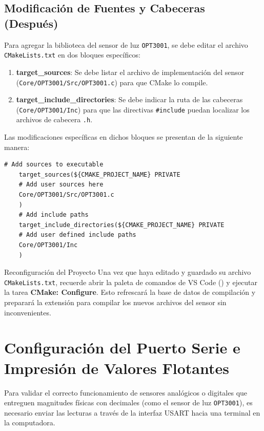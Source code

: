 \documentclass[
10pt, %
a4paper, %
oneside, %
headinclude,footinclude, %
BCOR5mm, %
]{scrartcl}
\begin{document}
\subsection{Modificación de Fuentes y Cabeceras (Después)}
Para agregar la biblioteca del sensor de luz \texttt{OPT3001}, se debe editar el archivo \texttt{CMakeLists.txt} en dos bloques específicos:
\begin{enumerate}
	\item \textbf{target\_sources}: Se debe listar el archivo de implementación del sensor (\texttt{Core/OPT3001/Src/OPT3001.c}) para que CMake lo compile.
	\item \textbf{target\_include\_directories}: Se debe indicar la ruta de las cabeceras (\texttt{Core/OPT3001/Inc}) para que las directivas \texttt{\#include} puedan localizar los archivos de cabecera \texttt{.h}.
\end{enumerate}
Las modificaciones específicas en dichos bloques se presentan de la siguiente manera:
\begin{lstlisting}[style=CMakeStyle]
	# Add sources to executable
	target_sources(${CMAKE_PROJECT_NAME} PRIVATE
	# Add user sources here
	Core/OPT3001/Src/OPT3001.c
	)
	# Add include paths
	target_include_directories(${CMAKE_PROJECT_NAME} PRIVATE
	# Add user defined include paths
	Core/OPT3001/Inc
	)
\end{lstlisting}
\begin{InfoBox}{Reconfiguración del Proyecto}
	Una vez que haya editado y guardado su archivo \texttt{CMakeLists.txt}, recuerde abrir la paleta de comandos de VS Code () y ejecutar la tarea \textbf{CMake: Configure}. Esto refrescará la base de datos de compilación y preparará la extensión para compilar los nuevos archivos del sensor sin inconvenientes.
\end{InfoBox}

\newpage
\section{Configuración del Puerto Serie e Impresión de Valores Flotantes}

Para validar el correcto funcionamiento de sensores analógicos o digitales que entreguen magnitudes físicas con decimales (como el sensor de luz \texttt{OPT3001}), es necesario enviar las lecturas a través de la interfaz USART hacia una terminal en la computadora.
\end{document}
